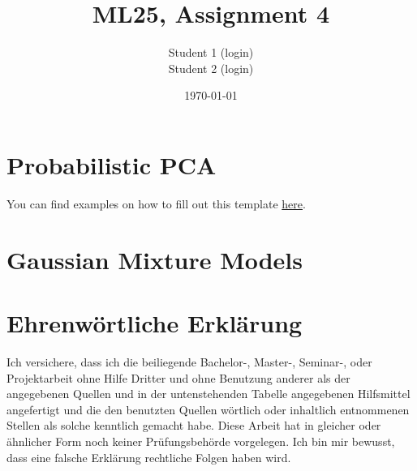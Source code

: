 \documentclass[a4paper,oneside,bibliography=totoc]{scrartcl}
\begin{document}
\title{ML25, Assignment 4}
\author{Student 1 (login)\\
  Student 2 (login)}
\date{\today}
\maketitle

\section{Probabilistic PCA}

You can find examples on how to fill out this template
\href{https://www.uni-mannheim.de/media/Einrichtungen/dws/Files_Teaching/Theses/dws-templates.zip}{here}.

\section{Gaussian Mixture Models}


\clearpage
\section*{Ehrenwörtliche Erklärung}

Ich versichere, dass ich die beiliegende Bachelor-, Master-, Seminar-, oder
Projektarbeit ohne Hilfe Dritter und ohne Benutzung anderer als der angegebenen
Quellen und in der untenstehenden Tabelle angegebenen Hilfsmittel angefertigt
und die den benutzten Quellen wörtlich oder inhaltlich entnommenen Stellen als
solche kenntlich gemacht habe. Diese Arbeit hat in gleicher oder ähnlicher Form
noch keiner Prüfungsbehörde vorgelegen. Ich bin mir bewusst, dass eine falsche
Erklärung rechtliche Folgen haben wird.
\end{document}
